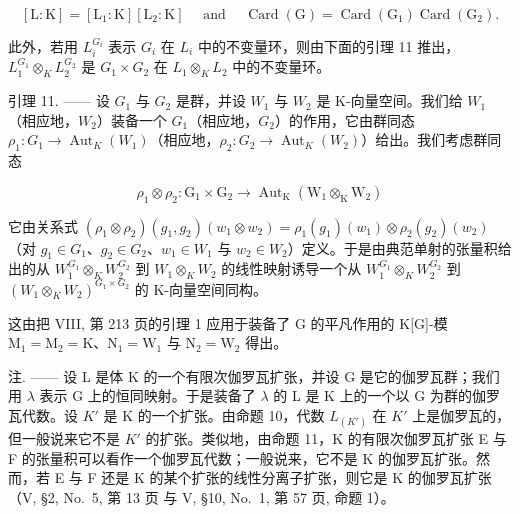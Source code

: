 \[
[ \mathrm{L}: \mathrm{K} ] = [ \mathrm{L} _ {1}: \mathrm{K} ] [ \mathrm{L} _ {2}: \mathrm{K} ] \quad \text { and } \quad \operatorname{Card} (\mathrm{G}) = \operatorname{Card} (\mathrm{G} _ {1})   \operatorname{Card} (\mathrm{G} _ {2}).
\]

此外，若用 \(L_{i}^{G_{i}}\) 表示 \(G_{i}\) 在 \(L_{i}\) 中的不变量环，则由下面的引理 11 推出，\(L_{1}^{G_{1}} \otimes_{K} L_{2}^{G_{2}}\) 是 \(G_{1} \times G_{2}\) 在 \(L_{1} \otimes_{K} L_{2}\) 中的不变量环。

引理 11. —— 设 \(G_{1}\) 与 \(G_{2}\) 是群，并设 \(W_{1}\) 与 \(W_{2}\) 是 K-向量空间。我们给 \(W_{1}\)（相应地，\(W_{2}\)）装备一个 \(G_{1}\)（相应地，\(G_{2}\)）的作用，它由群同态 \(\rho_{1}: G_{1} \to \operatorname{Aut}_{K}(W_{1})\)（相应地，\(\rho_{2}: G_{2} \to \operatorname{Aut}_{K}(W_{2})\)）给出。我们考虑群同态

\[
\rho_ {1} \otimes \rho_ {2}: \mathrm{G} _ {1} \times \mathrm{G} _ {2} \longrightarrow \operatorname{Aut} _ {\mathrm{K}} (\mathrm{W} _ {1} \otimes_ {\mathrm{K}} \mathrm{W} _ {2})
\]

它由关系式 \((\rho_{1}\otimes\rho_{2})(g_{1},g_{2})(w_{1}\otimes w_{2})=\rho_{1}(g_{1})(w_{1})\otimes\rho_{2}(g_{2})(w_{2})\)（对 \(g_{1}\in G_{1}\)、\(g_{2}\in G_{2}\)、\(w_{1}\in W_{1}\) 与 \(w_{2}\in W_{2}\)）定义。于是由典范单射的张量积给出的从 \(W_{1}^{G_{1}}\otimes_{K}W_{2}^{G_{2}}\) 到 \(W_{1}\otimes_{K}W_{2}\) 的线性映射诱导一个从 \(W_{1}^{G_{1}}\otimes_{K}W_{2}^{G_{2}}\) 到 \((W_{1}\otimes_{K}W_{2})^{G_{1}\times G_{2}}\) 的 K-向量空间同构。

这由把 VIII, 第 213 页的引理 1 应用于装备了 G 的平凡作用的 K{[}G{]}-模 \(\mathrm{M}_1 = \mathrm{M}_2 = \mathrm{K}\)、\(\mathrm{N}_1 = \mathrm{W}_1\) 与 \(\mathrm{N}_2 = \mathrm{W}_2\) 得出。

注. —— 设 L 是体 K 的一个有限次伽罗瓦扩张，并设 G 是它的伽罗瓦群；我们用 \(\lambda\) 表示 G 上的恒同映射。于是装备了 \(\lambda\) 的 L 是 K 上的一个以 G 为群的伽罗瓦代数。设 \(K'\) 是 K 的一个扩张。由命题 10，代数 \(L_{(K')}\) 在 \(K'\) 上是伽罗瓦的，但一般说来它不是 \(K'\) 的扩张。类似地，由命题 11，K 的有限次伽罗瓦扩张 E 与 F 的张量积可以看作一个伽罗瓦代数；一般说来，它不是 K 的伽罗瓦扩张。然而，若 E 与 F 还是 K 的某个扩张的线性分离子扩张，则它是 K 的伽罗瓦扩张（V, §2, No.~5, 第 13 页 与 V, §10, No.~1, 第 57 页, 命题 1）。

